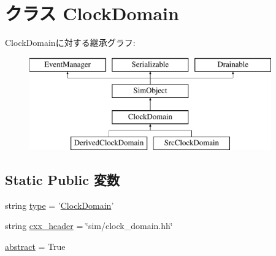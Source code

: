 \hypertarget{classClockDomain_1_1ClockDomain}{
\section{クラス ClockDomain}
\label{classClockDomain_1_1ClockDomain}
}
ClockDomainに対する継承グラフ:\begin{figure}[H]
\begin{center}
\leavevmode
\includegraphics[height=4cm]{classClockDomain_1_1ClockDomain}
\end{center}
\end{figure}
\subsection*{Static Public 変数}
\begin{DoxyCompactItemize}
\item 
string \hyperlink{classClockDomain_1_1ClockDomain_acce15679d830831b0bbe8ebc2a60b2ca}{type} = '\hyperlink{classClockDomain_1_1ClockDomain}{ClockDomain}'
\item 
string \hyperlink{classClockDomain_1_1ClockDomain_a17da7064bc5c518791f0c891eff05fda}{cxx\_\-header} = \char`\"{}sim/clock\_\-domain.hh\char`\"{}
\item 
\hyperlink{classClockDomain_1_1ClockDomain_a17fa61ac3806b481cafee5593b55e5d0}{abstract} = True
\end{DoxyCompactItemize}


